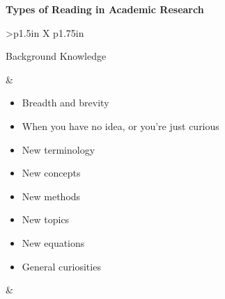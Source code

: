 \documentclass[8pt]{extarticle}
\begin{document}
\centering

{
    \Large\bfseries Types of Reading in Academic Research
}


\begin{tabularx}{\linewidth}{>{\bfseries}p{1.5in} X p{1.75in}}
    \toprule

    \begin{minipage}[t]{\linewidth}
        \vspace{0pt}
        Background Knowledge
    \end{minipage}

            &   \begin{minipage}[t]{\linewidth}
                    \vspace{0pt}

                    \begin{whatBox}
                    \begin{itemize}[nosep,leftmargin=*]
                        \item Breadth and brevity
                        \item When you have no idea, or you're just curious
                    \end{itemize}
                    \end{whatBox}

                    \begin{whenBox}
                    \begin{multicols}{2}
                    \begin{itemize}[nosep,leftmargin=*]
                        \item New terminology
                        \item New concepts
                        \item New methods
                        \item New topics
                        \item New equations
                        \item General curiosities
                    \end{itemize}
                    \end{multicols}
                    \end{whenBox}
                \end{minipage}
            
                    &   \begin{minipage}[t]{\linewidth}
                            \vspace{0pt}


\end{minipage}
\end{tabularx}
\end{document}
